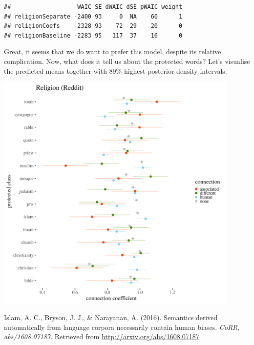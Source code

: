 \documentclass[]{book}
\begin{document}
\begin{verbatim}
##                   WAIC SE dWAIC dSE pWAIC weight
## religionSeparate -2400 93     0  NA    60      1
## religionCoefs    -2328 93    72  29    20      0
## religionBaseline -2283 95   117  37    16      0
\end{verbatim}

\normalsize

Great, it seems that we do want to prefer this model, despite its
relative complication. Now, what does it tell us about the protected
words? Let's visualise the predicted means together with 89\% highest
posterior density intervals.

\includegraphics[width=12cm]{../images/visReligionReddit.png}

\hypertarget{refs}{}
\hypertarget{ref-Caliskan2017Semantics}{}
Islam, A. C., Bryson, J. J., \& Narayanan, A. (2016). Semantics derived
automatically from language corpora necessarily contain human biases.
\emph{CoRR}, \emph{abs/1608.07187}. Retrieved from
\url{http://arxiv.org/abs/1608.07187}
\end{document}
